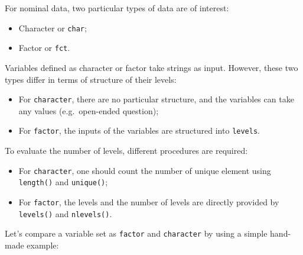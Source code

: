\documentclass[
]{book}
\newenvironment{Shaded}{\begin{snugshade}}{\end{snugshade}}
\newcommand{\AttributeTok}[1]{\textcolor[rgb]{0.77,0.63,0.00}{#1}}
\newcommand{\FunctionTok}[1]{\textcolor[rgb]{0.00,0.00,0.00}{#1}}
\newcommand{\NormalTok}[1]{#1}
\newcommand{\OtherTok}[1]{\textcolor[rgb]{0.56,0.35,0.01}{#1}}
\newcommand{\SpecialCharTok}[1]{\textcolor[rgb]{0.00,0.00,0.00}{#1}}
\providecommand{\tightlist}{%
  \setlength{\itemsep}{0pt}\setlength{\parskip}{0pt}}
\begin{document}
For nominal data, two particular types of data are of interest:

\begin{itemize}
\tightlist
\item
  Character or \texttt{char};
\item
  Factor or \texttt{fct}.
\end{itemize}

Variables defined as character or factor take strings as input. However, these two types differ in terms of structure of their levels:

\begin{itemize}
\tightlist
\item
  For \texttt{character}, there are no particular structure, and the variables can take any values (e.g.~open-ended question);
\item
  For \texttt{factor}, the inputs of the variables are structured into \texttt{levels}.
\end{itemize}

To evaluate the number of levels, different procedures are required:

\begin{itemize}
\tightlist
\item
  For \texttt{character}, one should count the number of unique element using \texttt{length()} and \texttt{unique()};
\item
  For \texttt{factor}, the levels and the number of levels are directly provided by \texttt{levels()} and \texttt{nlevels()}.
\end{itemize}

Let's compare a variable set as \texttt{factor} and \texttt{character} by using a simple hand-made example:

\begin{Shaded}
\end{Shaded}
\end{document}
